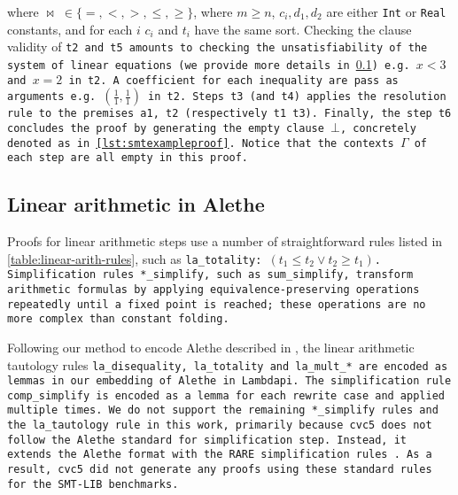 where $\bowtie\;\in \{=, <, >, \leq, \geq\}$, where $m\geq n$, $c_i, d_1, d_2$ are either \lstinline[language=SMT]{Int} or \lstinline[language=SMT]{Real}
constants, and for each $i$ $c_i$ and $t_i$ have the same sort.
Checking the clause validity of \tt{t2} and \tt{t5} amounts to checking the unsatisfiability of the system of linear equations (we provide more details in \cref{ssect:la-in-alethe}) e.g. $x < 3$ and $x = 2$ in \tt{t2}.
A coefficient for each inequality are pass as arguments e.g. $(\frac{1}{1},\frac{1}{1})$ in \tt{t2}.
Steps \tt{t3} (and \tt{t4}) applies the \colorbox{purple!30}{\texttt{resolution}} rule to the premises \tt{a1}, \tt{t2} (respectively \tt{t1} \tt{t3}).
Finally, the step \texttt{t6} concludes the proof by generating the empty clause $\bot$, concretely denoted as  in \cref{lst:smtexampleproof}.
Notice that the contexts \colorbox{blue!30}{$\Gamma$} of each step are all empty in this proof.

\subsection{Linear arithmetic in Alethe}
\label{ssect:la-in-alethe}

Proofs for linear arithmetic steps use a number of straightforward rules listed in \cref{table:linear-arith-rules}, such as \tt{la\_totality}: $(t_1 \leq t_2 \lor t_2 \geq t_1)$.
Simplification rules \tt{*\_simplify}, such as \tt{sum\_simplify}, transform arithmetic formulas by applying equivalence-preserving operations repeatedly until a fixed point is reached;
these operations are no more complex than constant folding.

Following our method to encode Alethe described in \cite{ColtellacciMD24}, the linear arithmetic tautology rules \tt{la\_disequality}, \tt{la\_totality} and \tt{la\_mult\_*} are encoded as lemmas in our embedding of Alethe in Lambdapi.
The simplification rule \tt{comp\_simplify} is encoded as a lemma for each rewrite case and applied multiple times.
We do not support the remaining \tt{*\_simplify} rules and the \tt{la\_tautology} rule in this work, primarily because cvc5 does not follow the Alethe standard for simplification step.
Instead, it extends the Alethe format with the RARE simplification rules \cite{rare}. As a result, cvc5 did not generate any proofs using these standard rules for the SMT-LIB benchmarks.

